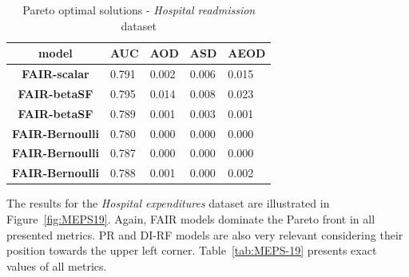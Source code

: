 \documentclass[preprint,12pt]{elsarticle}
\begin{document}
\begin{table}
	\centering
	\caption{Pareto optimal solutions - \textit{Hospital readmission} dataset}
	\begin{tabular}{|c|l|l|l|l|}
		\hline
		\textbf{model}          & \multicolumn{1}{c|}{\textbf{AUC}} & \multicolumn{1}{c|}{\textbf{AOD}} & \multicolumn{1}{c|}{\textbf{ASD}} & \multicolumn{1}{c|}{\textbf{AEOD}} \\ \hline
		\textbf{FAIR-scalar}    & 0.791                             & 0.002                             & 0.006                             & 0.015                              \\ \hline
		\textbf{FAIR-betaSF}    & 0.795                             & 0.014                             & 0.008                             & 0.023                              \\ \hline
		\textbf{FAIR-betaSF}    & 0.789                             & 0.001                             & 0.003                             & 0.001                              \\ \hline
		\textbf{FAIR-Bernoulli} & 0.780                             & 0.000                             & 0.000                             & 0.000                              \\ \hline
		\textbf{FAIR-Bernoulli} & 0.787                             & 0.000                             & 0.000                             & 0.000                              \\ \hline
		\textbf{FAIR-Bernoulli} & 0.788                             & 0.001                             & 0.000                             & 0.002                              \\ \hline
	\end{tabular}
	\label{tab:Readmission}%
\end{table}

The results for the \textit{Hospital expenditures} dataset are illustrated in Figure~\ref{fig:MEPS19}. Again, FAIR models dominate the Pareto front in all presented metrics. PR and DI-RF models are also very relevant considering their position towards the upper left corner. Table~\ref{tab:MEPS-19} presents exact values of all metrics.
\end{document}
